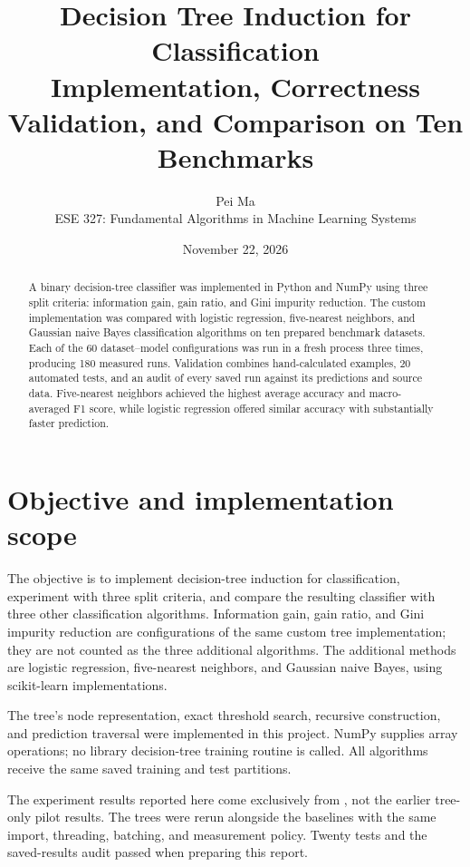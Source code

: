 \documentclass[11pt,letterpaper]{article}
\title{Decision Tree Induction for Classification\\
\large Implementation, Correctness Validation, and Comparison on Ten Benchmarks}
\author{Pei Ma\\[0.4em]\large ESE 327: Fundamental Algorithms in Machine Learning Systems}
\date{November 22, 2026}
\newcommand{\code}[1]{\texttt{\detokenize{#1}}}
\begin{document}
\maketitle

\begin{abstract}
A binary decision-tree classifier was implemented in Python and NumPy
using three split criteria: information gain, gain ratio, and Gini impurity reduction. 
The custom implementation was compared with logistic regression, five-nearest 
neighbors, and Gaussian naive Bayes classification algorithms on ten prepared 
benchmark datasets.  
Each of the 60 dataset--model
configurations was run in a fresh process three times, producing 180 measured
runs. 
Validation combines hand-calculated examples, 20 automated tests, and an
audit of every saved run against its predictions and source data.
Five-nearest neighbors achieved the highest average accuracy and macro-averaged
F1 score, while logistic regression offered similar accuracy with substantially
faster prediction.
\end{abstract}

\tableofcontents
\clearpage

\section{Objective and implementation scope}
The objective is to implement decision-tree induction for classification,
experiment with three split criteria, and compare the resulting classifier with
three other classification algorithms. Information gain, gain ratio,
and Gini impurity reduction are configurations of the same custom tree implementation; they are
not counted as the three additional algorithms. The additional methods are
logistic regression, five-nearest neighbors, and Gaussian naive Bayes, 
using scikit-learn implementations.

The tree's node representation, exact threshold search, recursive construction,
and prediction traversal were implemented in this project. NumPy supplies array
operations; no library decision-tree training routine is called. All algorithms
receive the same saved training and test partitions.

The experiment results reported here come exclusively from
\code{results/comparison/}, not the earlier tree-only pilot results. The trees
were rerun alongside the baselines with the same import, threading, batching,
and measurement policy. Twenty tests and the saved-results audit passed when
preparing this report.
\end{document}
